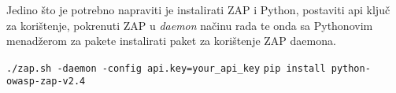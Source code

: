 Jedino što je potrebno napraviti je instalirati ZAP i Python, postaviti api ključ za korištenje, pokrenuti ZAP u \textit{daemon} načinu rada
te onda sa Pythonovim menadžerom za pakete instalirati paket za korištenje ZAP daemona.

\noindent
\texttt{./zap.sh -daemon -config api.key=your\_api\_key}\newline
\texttt{pip install python-owasp-zap-v2.4}